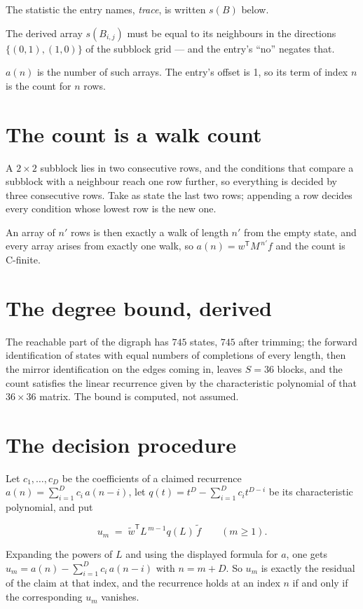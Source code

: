\documentclass[11pt]{article}
\theoremstyle{definition}
\begin{document}
The statistic the entry names, {\itshape trace}, is written $s(B)$ below.

The derived array $s(B_{i,j})$ must be equal to its neighbours in the directions $\{(0,1), (1,0)\}$ of the subblock grid --- and the entry's ``no'' negates that.

$a(n)$ is the number of such arrays. The entry's offset is 1, so its term of index $n$ is the count for $n$ rows.

\section{The count is a walk count}

A $2\times2$ subblock lies in two consecutive rows, and the conditions that compare a subblock with a neighbour reach one row further, so everything is decided by three consecutive rows. Take as state the last two rows; appending a row decides every condition whose lowest row is the new one.

An array of $n'$ rows is then exactly a walk of length $n'$ from the empty state, and every array arises from exactly one walk, so $a(n) = w^{\mathsf T}M^{\,n'}f$ and the count is C-finite.

\section{The degree bound, derived}

The reachable part of the digraph has $745$ states, $745$ after trimming; the forward identification of states with equal numbers of completions of every length, then the mirror identification on the edges coming in, leaves $S = 36$ blocks, and the count satisfies the linear recurrence given by the characteristic polynomial of that $36\times36$ matrix. The bound is computed, not assumed.

\section{The decision procedure}

Let $c_1,\dots,c_D$ be the coefficients of a claimed recurrence $a(n) = \sum_{i=1}^{D} c_i\,a(n-i)$, let $q(t) = t^{D} - \sum_{i=1}^{D} c_i t^{D-i}$ be its characteristic polynomial, and put

\[u_m \;=\; \tilde w^{\mathsf T} L^{\,m-1} q(L)\,\tilde f \qquad (m \ge 1).\]

Expanding the powers of $L$ and using the displayed formula for $a$, one gets $u_m = a(n) - \sum_{i=1}^{D} c_i\,a(n-i)$ with $n = m + D$. So $u_m$ is exactly the residual of the claim at that index, and the recurrence holds at an index $n$ if and only if the corresponding $u_m$ vanishes.
\end{document}
